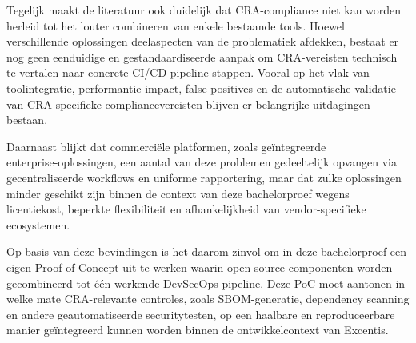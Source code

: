 Tegelijk maakt de literatuur ook duidelijk dat CRA-compliance niet kan worden herleid tot het louter combineren van enkele bestaande tools. Hoewel verschillende oplossingen deelaspecten van de problematiek afdekken, bestaat er nog geen eenduidige en gestandaardiseerde aanpak om CRA-vereisten technisch te vertalen naar concrete CI/CD-pipeline-stappen. Vooral op het vlak van toolintegratie, performantie-impact, false positives en de automatische validatie van CRA-specifieke compliancevereisten blijven er belangrijke uitdagingen bestaan.

Daarnaast blijkt dat commerciële platformen, zoals geïntegreerde \\enterprise-oplossingen, een aantal van deze problemen gedeeltelijk opvangen via gecentraliseerde workflows en uniforme rapportering, maar dat zulke oplossingen minder geschikt zijn binnen de context van deze bachelorproef wegens licentiekost, beperkte flexibiliteit en afhankelijkheid van vendor-specifieke ecosystemen.

Op basis van deze bevindingen is het daarom zinvol om in deze bachelorproef een eigen Proof of Concept uit te werken waarin open source componenten worden gecombineerd tot één werkende DevSecOps-pipeline. Deze PoC moet aantonen in welke mate CRA-relevante controles, zoals SBOM-generatie, dependency scanning en andere geautomatiseerde securitytesten, op een haalbare en reproduceerbare manier geïntegreerd kunnen worden binnen de ontwikkelcontext van Excentis.




